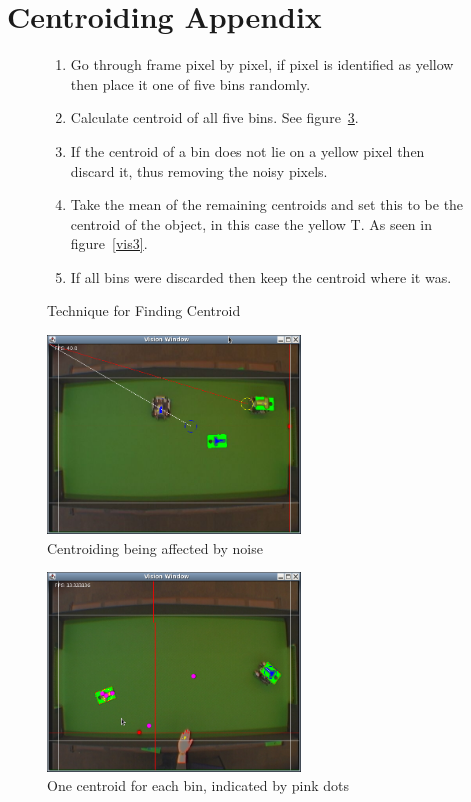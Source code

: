 \section{Centroiding Appendix}
\label{apx:centre}

\begin{figure}[h]
    \caption{Technique for Finding Centroid}
    \label{bins}
    \centering
        \begin{enumerate}
            \item Go through frame pixel by pixel, if pixel is identified as yellow then place it one of five bins randomly.
            \item Calculate centroid of all five bins. See figure~\ref{vis2}.
            \item If the centroid of a bin does not lie on a yellow pixel then discard it, thus removing the noisy pixels.
            \item Take the mean of the remaining centroids and set this to be the centroid of the object, in this case the yellow T.  As seen in figure~\ref{vis3}.
            \item If all bins were discarded then keep the centroid where it was.
        \end{enumerate}
\end{figure}

\begin{figure}[h]
  \caption{Centroiding being affected by noise}
  \label{vis1}
  \centering
    \includegraphics[width=0.6\textwidth]{randy_bins_before.png}
\end{figure}

\begin{figure}[h]
  \caption{One centroid for each bin, indicated by pink dots}
  \label{vis2}
  \centering
    \includegraphics[width=0.6\textwidth]{randy_bins_after_mult.png}
\end{figure}

